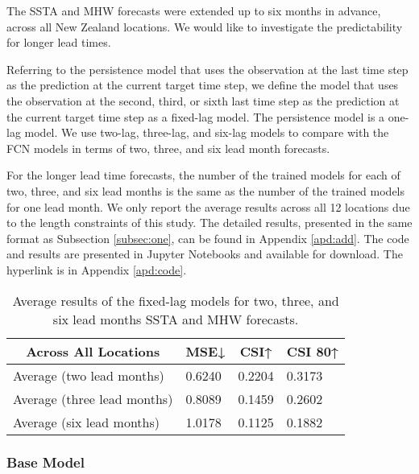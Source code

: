 \documentclass[11pt, a4paper]{article}
\begin{document}
The SSTA and MHW forecasts were extended up to six months in advance, across all New Zealand locations. We would like to investigate the predictability for longer lead times.

Referring to the persistence model that uses the observation at the last time step as the prediction at the current target time step, we define the model that uses the observation at the second, third, or sixth last time step as the prediction at the current target time step as a fixed-lag model. The persistence model is a one-lag model. We use two-lag, three-lag, and six-lag models to compare with the FCN models in terms of two, three, and six lead month forecasts.

For the longer lead time forecasts, the number of the trained models for each of two, three, and six lead months is the same as the number of the trained models for one lead month. We only report the average results across all 12 locations due to the length constraints of this study. The detailed results, presented in the same format as Subsection \ref{subsec:one}, can be found in Appendix \ref{apd:add}. The code and results are presented in Jupyter Notebooks and available for download. The hyperlink is in Appendix \ref{apd:code}.

\begin{table}[H]
\centering
\scriptsize
\caption{Average results of the fixed-lag models for two, three, and six lead months SSTA and MHW forecasts.}\label{tb:persistall}
\begin{tabular}{llll}
\multicolumn{1}{c}{\textbf{Across All Locations}} & \multicolumn{1}{c}{\textbf{MSE↓}} & \multicolumn{1}{c}{\textbf{CSI↑}} & \multicolumn{1}{c}{\textbf{CSI 80↑}} \\ \hline
Average (two lead months)                         & 0.6240                            & 0.2204                            & 0.3173                               \\
Average (three lead months)                       & 0.8089                            & 0.1459                            & 0.2602                               \\
Average (six lead months)                         & 1.0178                            & 0.1125                            & 0.1882
\end{tabular}
\end{table}

\subsubsection{Base Model}
\end{document}
